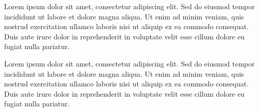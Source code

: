\documentclass[proposal,indonesia]{ugmskripsi}
\begin{document}
\cover
\titlepageind
\approvalpage

\tableofcontents

\abstractind

Lorem ipsum dolor sit amet, consectetur adipiscing elit. Sed do eiusmod tempor incididunt ut labore et dolore magna aliqua. Ut enim ad minim veniam, quis nostrud exercitation ullamco laboris nisi ut aliquip ex ea commodo consequat. Duis aute irure dolor in reprehenderit in voluptate velit esse cillum dolore eu fugiat nulla pariatur.
\endabstractind

\abstracteng

Lorem ipsum dolor sit amet, consectetur adipiscing elit. Sed do eiusmod tempor incididunt ut labore et dolore magna aliqua. Ut enim ad minim veniam, quis nostrud exercitation ullamco laboris nisi ut aliquip ex ea commodo consequat. Duis aute irure dolor in reprehenderit in voluptate velit esse cillum dolore eu fugiat nulla pariatur.
\endabstracteng







\end{document}
